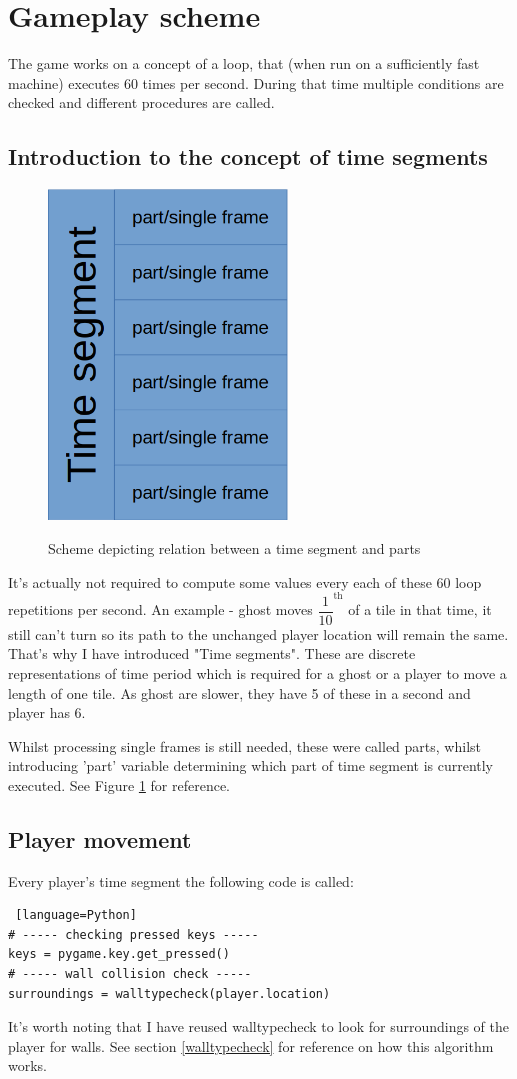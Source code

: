 \documentclass[11pt,a4paper]{report}
\newcommand{\dsubsection}[1]{\FloatBarrier \subsection{#1}}
\newenvironment{img}{
	\begin{center}
		\begin{figure}[H]
			\begin{center}
			
}{
	\end{center}
		\end{figure}
			\end{center}
}
\begin{document}
		\section{Gameplay scheme}
			The game works on a concept of a loop, that (when run on a sufficiently fast machine) executes 60 times per second. During that time multiple  conditions are checked and different procedures are called.
			\dsubsection{Introduction to the concept of time segments}
				\label{timesegments}
				\begin{img}
					\includegraphics[width=180pt]{images/segment-part-relation}\\
					\caption{Scheme depicting relation between a time segment and parts}
					\label{segment-part-relation}
				\end{img}
				It's actually not required to compute some values every each of these 60 loop repetitions per second. An example - ghost moves $\dfrac{1}{10}^{\text{th}}$ of a tile in that time, it still can't turn so its path to the unchanged player location will remain the same. That's why I have introduced "Time segments". These are discrete representations of time period which is required for a ghost or a player to move a length of one tile. As ghost are slower, they have 5 of these in a second and player has 6. 
				\label{part_definition}
				
				Whilst processing single frames is still needed, these were called parts, whilst introducing 'part' variable determining which part of time segment is currently executed. See Figure \ref{segment-part-relation} for reference.
			\dsubsection{Player movement}
				Every player's time segment the following code is called:
				\begin{lstlisting} [language=Python]
# ----- checking pressed keys -----
keys = pygame.key.get_pressed()
# ----- wall collision check -----
surroundings = walltypecheck(player.location)
				\end{lstlisting}
				It's worth noting that I have reused walltypecheck to look for surroundings of the player for walls. See section \ref{walltypecheck} for reference on how this algorithm works.
				
\end{document}
